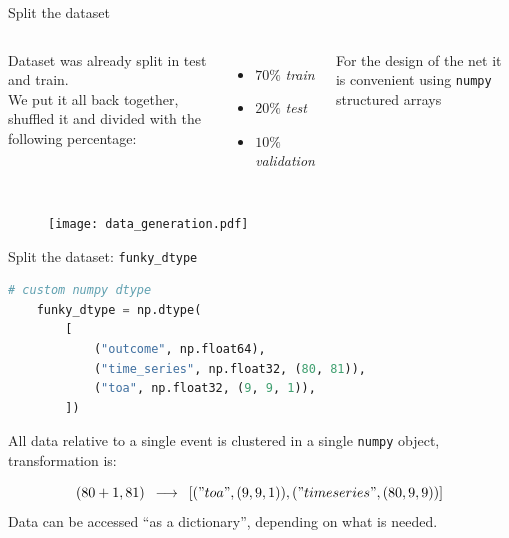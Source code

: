\documentclass{beamer}
\begin{document}
\begin{frame}{Split the dataset}

    \begin{columns}
    
    Dataset was already split in test and train.\\
    \vspace{10 pt}
    We put it all back together, shuffled it and divided with the following percentage:
    \begin{itemize}
        \item[\textbullet] $70\%$ \textit{train}
        \item[\textbullet] $20\%$ \textit{test}
        \item[\textbullet] $10\%$ \textit{validation}
        
    \end{itemize}
    \vspace{10 pt}

    For the design of the net it is convenient using \texttt{numpy} structured arrays
    
    
    
    
    \end{columns}

    

\end{frame}

\begin{frame}
    \begin{figure}
        \centering
        \texttt{[image: data\_generation.pdf]}
    \end{figure}
\end{frame}

\begin{frame}[fragile]{Split the dataset: \texttt{funky\_dtype}}

    
    \begin{lstlisting}[language=Python]
    # custom numpy dtype
    funky_dtype = np.dtype(
        [
            ("outcome", np.float64),
            ("time_series", np.float32, (80, 81)),
            ("toa", np.float32, (9, 9, 1)),
        ])
    \end{lstlisting}
    
    All data relative to a single event is clustered in a single \texttt{numpy} object, transformation is:
    
    \begin{equation*}
        (80 + 1, 81)\,\,\, \longrightarrow \,\,\, [("toa", (9, 9, 1)), ("timeseries", (80, 9,9))]
    \end{equation*}
    Data can be accessed ``as a dictionary'', depending on what is needed.

\end{frame}
\end{document}
